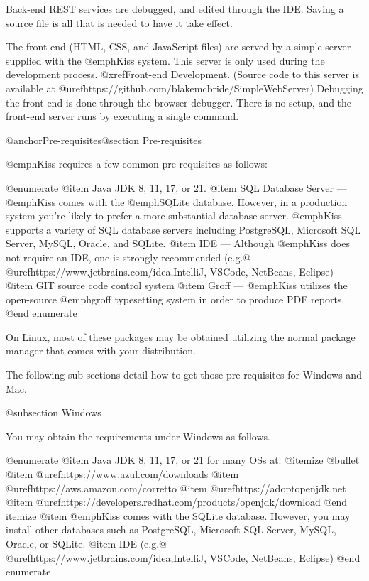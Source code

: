 Back-end REST services are debugged, and edited through the IDE.
Saving a source file is all that is needed to have it take effect.

The front-end (HTML, CSS, and JavaScript files) are served by a simple
server supplied with the @emph{Kiss} system.  This server is only used
during the development process.  @xref{Front-end Development}.
(Source code to this server is available at
@uref{https://github.com/blakemcbride/SimpleWebServer}) Debugging the
front-end is done through the browser debugger.  There is no setup,
and the front-end server runs by executing a single command.

@anchor{Pre-requisites}@section Pre-requisites

@emph{Kiss} requires a few common pre-requisites as follows:


@enumerate
@item
Java JDK 8, 11, 17, or 21. 
@item
SQL Database Server --- @emph{Kiss} comes with the @emph{SQLite} database.  However, in a production
system you're likely to prefer a more substantial database server.  @emph{Kiss} supports a variety of SQL database servers including 
PostgreSQL, Microsoft SQL Server, MySQL, Oracle, and SQLite.
@item
IDE --- Although @emph{Kiss} does not require an IDE, one is strongly recommended (e.g.@ @uref{https://www.jetbrains.com/idea,IntelliJ}, VSCode, NetBeans, Eclipse)
@item
GIT source code control system
@item
Groff --- @emph{Kiss} utilizes the open-source @emph{groff} typesetting system in order to produce PDF reports.
@end enumerate

On Linux, most of these packages may be obtained utilizing the normal
package manager that comes with your distribution.

The following sub-sections detail how to get those pre-requisites for Windows and Mac.

@subsection Windows


You may obtain the requirements under Windows as follows.

@enumerate
@item
Java JDK 8, 11, 17, or 21 for many OSs at:
@itemize @bullet
@item
@uref{https://www.azul.com/downloads}
@item
@uref{https://aws.amazon.com/corretto}
@item
@uref{https://adoptopenjdk.net}
@item
@uref{https://developers.redhat.com/products/openjdk/download}
@end itemize
@item
@emph{Kiss} comes with the SQLite database.  However, you may install other databases such as PostgreSQL, Microsoft SQL Server, MySQL,
Oracle, or SQLite.
@item
IDE (e.g.@ @uref{https://www.jetbrains.com/idea,IntelliJ}, VSCode, NetBeans, Eclipse)
@end enumerate

